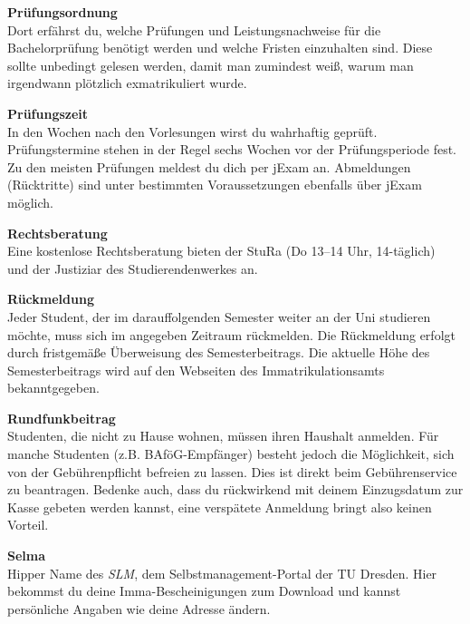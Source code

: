 \begin{multicols}{2}
\textbf{Prüfungsordnung} \\
Dort erfährst du, welche Prüfungen und Leistungsnachweise für die Bachelorprüfung benötigt werden und welche Fristen einzuhalten sind.
Diese sollte unbedingt gelesen werden, damit man zumindest weiß, warum man irgendwann plötzlich exmatrikuliert wurde.

\textbf{Prüfungszeit} \\
In den Wochen nach den Vorlesungen wirst du wahrhaftig geprüft.
Prüfungstermine stehen in der Regel sechs Wochen vor der Prüfungsperiode fest.
Zu den meisten Prüfungen meldest du dich per jExam an.
Abmeldungen (Rücktritte) sind unter bestimmten Voraussetzungen ebenfalls über jExam möglich.


\textbf{Rechtsberatung} \\
Eine kostenlose Rechtsberatung bieten der StuRa (Do 13--14 Uhr, 14-täglich)~ und der Justiziar des Studierendenwerkes an.

% 

\textbf{Rückmeldung} \\
Jeder Student, der im darauffolgenden Semester weiter an der Uni studieren möchte, muss sich im angegeben Zeitraum rückmelden.
Die Rückmeldung erfolgt durch fristgemäße Überweisung des Semesterbeitrags.
Die aktuelle Höhe des Semesterbeitrags wird auf den Webseiten des Immatrikulationsamts bekanntgegeben.~

\textbf{Rundfunkbeitrag} \\
Studenten, die nicht zu Hause wohnen, müssen ihren Haushalt anmelden.
Für manche Studenten (z.B. BAföG-Empfänger) besteht jedoch die Möglichkeit, sich von der Gebührenpflicht befreien zu lassen.
Dies ist direkt beim Gebührenservice zu beantragen.
Bedenke auch, dass du rückwirkend mit deinem Einzugsdatum zur Kasse gebeten werden kannst, eine verspätete Anmeldung bringt also keinen Vorteil.


\textbf{Selma} \\
Hipper Name des \textit{SLM}, dem Selbst\-management-Portal der TU Dresden.
Hier bekommst du deine Imma-Bescheinigungen zum Download und kannst persönliche Angaben wie deine Adresse ändern.~


\end{multicols}
